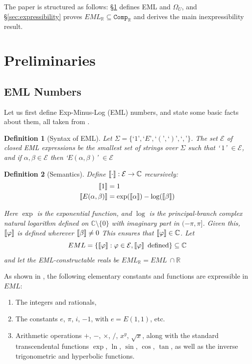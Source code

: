 \documentclass[a4paper,10pt]{article}
\newtheorem{definition}{Definition}
\newcommand{\rrbracket}{\right]\hspace{-0.15em}\right]}
\newcommand{\llbracket}{\left[\hspace{-0.15em}\left[}
\newcommand{\interpret}[1]{\llbracket #1 \rrbracket}
\begin{document}
The paper is structured as follows: \S\ref{sec:prelim} defines EML and $\Omega_U$, and \S\ref{sec:expressibility} proves $EML_\mathbb{R} \subseteq \mathtt{Comp}_\mathbb{R}$ and derives the main inexpressibility result.

\section{Preliminaries}\label{sec:prelim}

\subsection{EML Numbers}

Let us first define Exp-Minus-Log (EML) numbers, and state some basic facts about them, all taken from \cite{Odrzywolek2026}.

\begin{definition}[Syntax of EML]
    Let $\Sigma = \{ \text{`}1\text{'}, \text{`}E\text{'}, \text{`}(\text{'}, \text{`})\text{'}, \text{`},\text{'} \}$. The set $\mathcal{E}$ of closed EML expressions be the smallest set of strings over $\Sigma$ such that `$\ 1$' $\in \mathcal{E}$, and if $\alpha, \beta \in \mathcal{E}$ then `$E(\alpha, \beta)$' $\in \mathcal{E}$
\end{definition}

\begin{definition}[Semantics]\label{def:sem}
    Define $\interpret{\cdot} : \mathcal{E} \rightarrow \mathbb{C}$ recursively:
\begin{align*}
\interpret{1} &= 1 \\
\interpret{E(\alpha, \beta)} &= \exp(\interpret{\alpha}) - \log(\interpret{\beta})
\end{align*}

Here $\exp$ is the exponential function, and $\log$ is the principal-branch complex natural logarithm defined on $\mathbb{C} \setminus \{0\}$ with imaginary part in $(-\pi, \pi]$. Given this, $\interpret{\varphi}$ is defined wherever $\interpret{\beta} \neq 0$ This ensures that $\interpret{\varphi} \in \mathbb{C}$. Let $$ EML = \{ \interpret{\varphi}: \varphi \in \mathcal{E}, \interpret{\varphi} \text{ defined} \} \subseteq \mathbb{C}$$ and let the EML-constructable reals be $EML_\mathbb{R} = EML\ \cap \mathbb{R} $
\end{definition}

As shown in \cite{Odrzywolek2026}, the following elementary constants and functions are expressible in $EML$:
\begin{enumerate}
    \item The integers and rationals,
    \item The constants $e$, $\pi$, $i$, $-1$, with $e = E(1,1)$, etc.
    \item Arithmetic operations $+$, $-$, $\times$, $/$, $x^y$, $\sqrt{x}$, along with the standard transcendental functions $\exp$, $\ln$, $\sin$, $\cos$, $\tan$, as well as the inverse trigonometric and hyperbolic functions. 
\end{enumerate}
\end{document}

